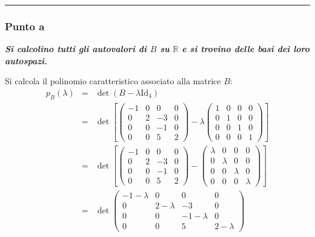 \documentclass[a4paper]{article}
\newcommand{\longline}{\noindent\rule{\textwidth}{0.4pt}}
\begin{document}
	\longline
	
	\subsubsection{Punto a}

	\textcolor{Green4}{\textbf{\emph{Si calcolino tutti gli autovalori di $B$ su $\mathbb{R}$ e si trovino delle basi dei loro autospazi.}}}\newline

	\noindent
	Si calcola il polinomio caratteristico associato alla matrice $B$:
	\begin{equation*}
		\begin{array}{lll}
			p_{B}\left(\lambda\right) &=& \det\left(B - \lambda \mathrm{Id}_{4}\right) \\ [.7em]
			&=& \det\left[
				\begin{pmatrix}
					-1	& 0		& 0		& 0 \\
					0	& 2		& -3	& 0 \\
					0	& 0		& -1	& 0 \\
					0	& 0		& 5		& 2
				\end{pmatrix} -
				\lambda \begin{pmatrix}
					1	& 0		& 0		& 0 \\
					0	& 1		& 0		& 0 \\
					0	& 0		& 1		& 0 \\
					0	& 0		& 0		& 1
				\end{pmatrix}
			\right] \\ [2.5em]
			&=& \det\left[
				\begin{pmatrix}
					-1	& 0		& 0		& 0 \\
					0	& 2		& -3	& 0 \\
					0	& 0		& -1	& 0 \\
					0	& 0		& 5		& 2
				\end{pmatrix} -
				\begin{pmatrix}
					\lambda	& 0			& 0			& 0 \\
					0		& \lambda	& 0			& 0 \\
					0		& 0			& \lambda	& 0 \\
					0		& 0			& 0			& \lambda
				\end{pmatrix}
			\right] \\ [2.5em]
			&=& \det \begin{pmatrix}
				-1-\lambda	& 0			& 0				& 0 \\
					0		& 2-\lambda	& -3			& 0 \\
					0		& 0			& -1-\lambda	& 0 \\
					0		& 0			& 5				& 2-\lambda
			\end{pmatrix} \\ [2.5em]
		\end{array}
	\end{equation*}
\end{document}
